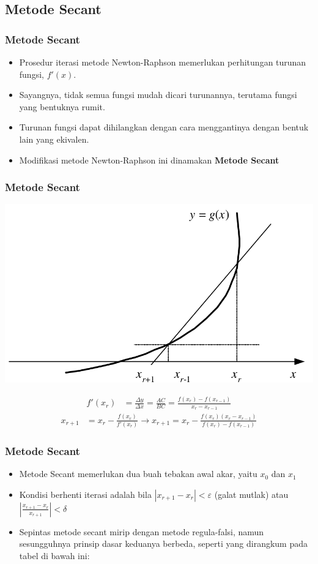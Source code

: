 \documentclass[pdflatex,compress]{beamer}
\begin{document}
\subsection{Metode Secant}

\begin{frame}
	\frametitle{Metode Secant}
	\begin{itemize}
		\item Prosedur iterasi metode Newton-Raphson memerlukan perhitungan turunan fungsi, $ f'(x) $.
		\item Sayangnya, tidak semua fungsi mudah dicari turunannya, terutama fungsi yang bentuknya rumit.
		\item Turunan fungsi dapat dihilangkan dengan cara menggantinya dengan bentuk lain yang ekivalen.
		\item Modifikasi metode Newton-Raphson ini dinamakan \textbf{Metode Secant}
	\end{itemize}
\end{frame}

\begin{frame}
	\frametitle{Metode Secant}
	\begin{center}
		\includegraphics[width=0.5\linewidth]{img/img16}
	\end{center}
	\begin{align*}
	f'(x_r) &= \frac{\Delta y}{\Delta x} = \frac{AC}{BC} = \frac{f(x_r) - f(x_{r-1})}{x_r - x_{r-1}}
	\end{align*}
	\begin{align*}
	x_{r+1} &= x_r - \frac{f(x_r)}{f'(x_r)} \rightarrow x_{r+1} = x_r - \frac{f(x_r)(x_r - x_{r-1})}{f(x_r) - f(x_{r-1})}
	\end{align*}	
\end{frame}

\begin{frame}
	\frametitle{Metode Secant}
	\begin{itemize}
		\item Metode Secant memerlukan dua buah tebakan awal akar, yaitu $ x_0 $ dan $ x_1 $
		\item Kondisi berhenti iterasi adalah bila $ |x_{r+1} - x_r| < \varepsilon $ (galat mutlak) atau $ \left| \frac{x_{r+1}-x_r}{x_{r+1}} \right| < \delta$
		\item Sepintas metode secant mirip dengan metode regula-falsi, namun sesungguhnya prinsip dasar keduanya berbeda, seperti yang dirangkum pada tabel di bawah ini:
	\end{itemize}
\end{frame}
\end{document}
